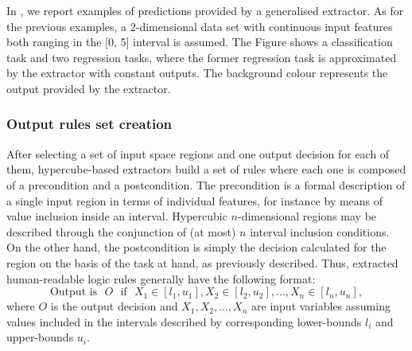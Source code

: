 \documentclass[
]{ceurart}
\begin{document}



In , we report examples of predictions provided by a generalised extractor.
%
As for the previous examples, a 2-dimensional data set with continuous input features both ranging in the [0, 5] interval is assumed.
%
The Figure shows a classification task and two regression tasks, where the former regression task is approximated by the extractor with constant outputs.
%
The background colour represents the output provided by the extractor.

\subsubsection{Output rules set creation}

After selecting a set of input space regions and one output decision for each of them, hypercube-based extractors build a set of rules where each one is composed of a precondition and a postcondition.
%
The precondition is a formal description of a single input region in terms of individual features, for instance by means of value inclusion inside an interval.
%
Hypercubic $n$-dimensional regions may be described through the conjunction of (at most) $n$ interval inclusion conditions.
%
On the other hand, the postcondition is simply the decision calculated for the region on the basis of the task at hand, as previously described.
%
Thus, extracted human-readable logic rules generally have the following format:
%
\begin{equation*}
	\text{Output is ~} O \text{~ if ~} X_1 \in [l_1, u_1], X_2 \in [l_2, u_2], ..., X_n \in [l_n, u_n],
\end{equation*}
%
where $O$ is the output decision and $X_1, X_2, ..., X_n$ are input variables assuming values included in the intervals described by corresponding lower-bounds $l_i$ and upper-bounds $u_i$.
\end{document}
